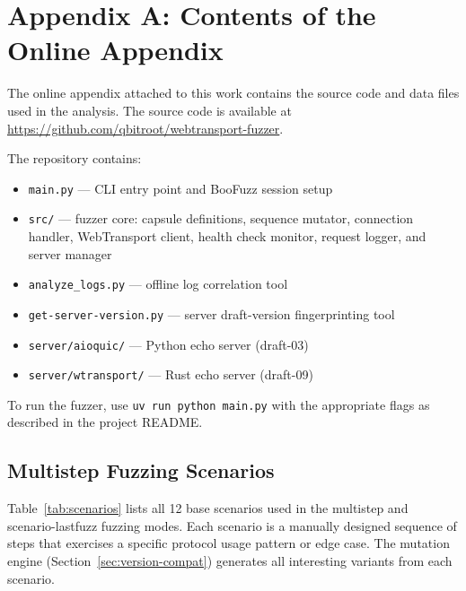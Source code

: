 \chapter*{Appendix A: Contents of the Online Appendix}

The online appendix attached to this work contains the source code and
data files used in the analysis. The source code is available at
\url{https://github.com/qbitroot/webtransport-fuzzer}.

The repository contains:
\begin{itemize}
    \item \texttt{main.py} --- CLI entry point and BooFuzz session setup
    \item \texttt{src/} --- fuzzer core: capsule definitions, sequence mutator, connection handler, WebTransport client, health check monitor, request logger, and server manager
    \item \texttt{analyze\_logs.py} --- offline log correlation tool
    \item \texttt{get-server-version.py} --- server draft-version fingerprinting tool
    \item \texttt{server/aioquic/} --- Python echo server (draft-03)
    \item \texttt{server/wtransport/} --- Rust echo server (draft-09)
\end{itemize}

To run the fuzzer, use \texttt{uv run python main.py} with the appropriate flags as described in the project README.

\section*{Multistep Fuzzing Scenarios}
\label{appendix:scenarios}

Table~\ref{tab:scenarios} lists all 12 base scenarios used in the multistep and scenario-lastfuzz fuzzing modes. Each scenario is a manually designed sequence of steps that exercises a specific protocol usage pattern or edge case. The mutation engine (Section~\ref{sec:version-compat}) generates all interesting variants from each scenario.

